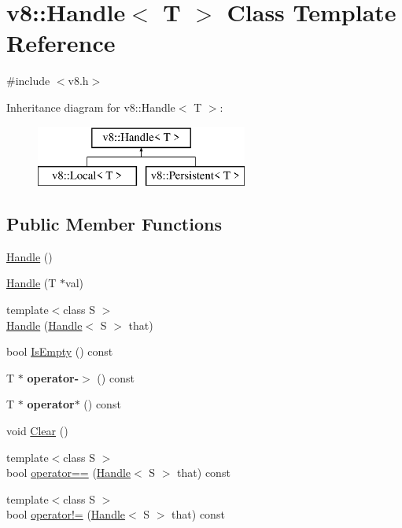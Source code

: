 \hypertarget{classv8_1_1_handle}{}\section{v8\+:\+:Handle$<$ T $>$ Class Template Reference}
\label{classv8_1_1_handle}


{\ttfamily \#include $<$v8.\+h$>$}

Inheritance diagram for v8\+:\+:Handle$<$ T $>$\+:\begin{figure}[H]
\begin{center}
\leavevmode
\includegraphics[height=2.000000cm]{classv8_1_1_handle}
\end{center}
\end{figure}
\subsection*{Public Member Functions}
\begin{DoxyCompactItemize}
\item 
\hyperlink{classv8_1_1_handle_aa7543a3d572565806a66e922634cc2f4}{Handle} ()
\item 
\hyperlink{classv8_1_1_handle_aac16277f1131898a4a2ef664d051cc18}{Handle} (T $\ast$val)
\item 
{\footnotesize template$<$class S $>$ }\\\hyperlink{classv8_1_1_handle_a64aee8fcde243c8a5abebfe534b3797a}{Handle} (\hyperlink{classv8_1_1_handle}{Handle}$<$ S $>$ that)
\item 
bool \hyperlink{classv8_1_1_handle_ab3b20b28e7f672de83a2dc8d6809f815}{Is\+Empty} () const 
\item 
\hypertarget{classv8_1_1_handle_af5285c2e91079e380651f83195383228}{}T $\ast$ {\bfseries operator-\/$>$} () const \label{classv8_1_1_handle_af5285c2e91079e380651f83195383228}

\item 
\hypertarget{classv8_1_1_handle_a524a50d9802a97beb1b5e405c6fc6f21}{}T $\ast$ {\bfseries operator$\ast$} () const \label{classv8_1_1_handle_a524a50d9802a97beb1b5e405c6fc6f21}

\item 
void \hyperlink{classv8_1_1_handle_a452516a09df056438c3d3a177ebd1977}{Clear} ()
\item 
{\footnotesize template$<$class S $>$ }\\bool \hyperlink{classv8_1_1_handle_afcc79738c6fff05c70e958a471f2b7d9}{operator==} (\hyperlink{classv8_1_1_handle}{Handle}$<$ S $>$ that) const 
\item 
{\footnotesize template$<$class S $>$ }\\bool \hyperlink{classv8_1_1_handle_ab550353b4a7bc3ad3df53fe80df7ea61}{operator!=} (\hyperlink{classv8_1_1_handle}{Handle}$<$ S $>$ that) const 
\end{DoxyCompactItemize}
